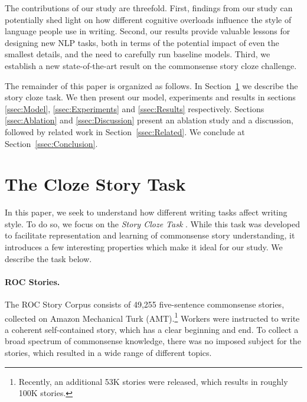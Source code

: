 \documentclass[11pt,a4paper]{article}
\newcommand{\secref}[1]{Section~\ref{ssec:#1}}
\newcommand{\isection}[2]{\section{#1}\label{ssec:#2}}
\begin{document}
The contributions of our study are threefold. 
First, findings from our study can potentially shed light on 
how different cognitive overloads influence the style of language people use in writing. 
Second, our results provide valuable lessons for designing new NLP tasks,
both in terms of the potential impact of even the smallest details, and the need to carefully run baseline models.
Third, we establish a new state-of-the-art result on the commonsense story cloze challenge. 


The remainder of this paper is organized as follows. In \secref{ROC_Story} we describe the story cloze task.
We then present our model, experiments and results in sections \ref{ssec:Model}, \ref{ssec:Experiments} and \ref{ssec:Results} respectively.
Sections \ref{ssec:Ablation} and \ref{ssec:Discussion} present an ablation study and a discussion, followed by related work in  \secref{Related}. 
We conclude at \secref{Conclusion}.

\isection{The Cloze Story Task}{ROC_Story}
In this paper, we seek to understand how different writing tasks affect writing style.
To do so, we focus on the \textit{Story Cloze Task} \cite{Mostafazadeh:2016}. 
While this task was developed to facilitate representation and learning of commonsense story understanding,
it introduces a few interesting properties which make it ideal for our study. 
We describe the task below.




\paragraph{ROC Stories.}

The ROC Story Corpus consists of 49,255 five-sentence commonsense stories, collected on Amazon Mechanical Turk (AMT).\footnote{Recently, an additional 53K stories were released, which results in roughly 100K stories.}
Workers were instructed to write a coherent self-contained story, which has a clear beginning and end. 
To collect a broad spectrum of commonsense knowledge, there was no imposed subject for the stories,
which resulted in a wide range of different topics.
\end{document}
